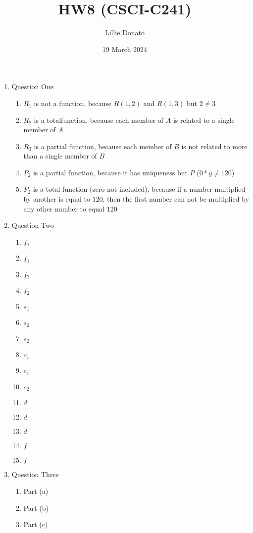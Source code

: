 \documentclass{article}
\title{HW8 (CSCI-C241)}
\author{Lillie Donato}
\date{19 March 2024}
\begin{document}
\maketitle

\begin{enumerate}
    \item Question One
    \begin{enumerate}
        \item $R_1$ is not a function, because $R(1, 2)$ and $R(1, 3)$ but $2 \neq 3$
        \item $R_2$ is a totalfunction, because each member of $A$ is related to a single member of $A$
        \item $R_3$ is a partial function, because each member of $B$ is not related to more than a single member of $B$
        \item $P_2$ is a partial function, because it has uniqueness but $P$ ($0*y \neq 120$)
        \item $P_2$ is a total function (zero not included), because if a number multiplied by another is equal to $120$, then the first number can not be multiplied by any other number to equal $120$
    \end{enumerate}
    \item Question Two
    \begin{enumerate}
        \item $f_1$
        \item $f_1$
        \item $f_2$
        \item $f_2$
        \item $s_1$
        \item $s_2$
        \item $s_2$
        \item $c_1$
        \item $c_1$
        \item $c_2$
        \item $d$
        \item $d$
        \item $d$
        \item $f$
        \item $f$
    \end{enumerate}
    \item Question Three
    \begin{enumerate}
        \item Part (a)
        \item Part (b)
        \item Part (c)

\end{enumerate}
\end{enumerate}
\end{document}
